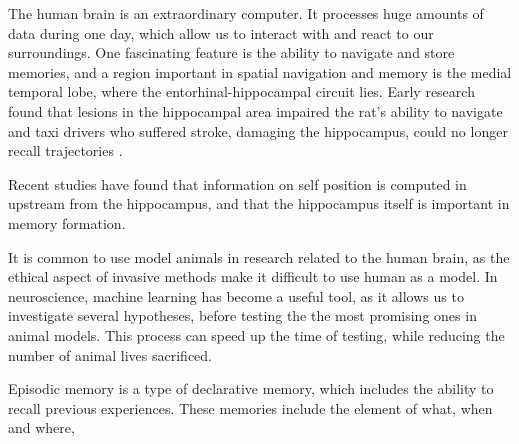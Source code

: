 



The human brain is an extraordinary computer. It processes huge amounts of data during one day, which allow us to interact with and react to our surroundings. %
One fascinating feature is the ability to navigate and store memories, and a region important in spatial navigation and memory is the medial temporal lobe, where the entorhinal-hippocampal circuit lies. Early research found that lesions in the hippocampal area impaired the rat's ability to navigate %
and taxi drivers who suffered stroke, damaging the hippocampus, could no longer recall trajectories \cite{maguire:2000:navigation}.

Recent studies have found that information on self position is computed in upstream from the hippocampus, and that the hippocampus itself is important in memory formation.

It is common to use model animals in research related to the human brain, as the ethical aspect of invasive methods make it difficult to use human as a model. In neuroscience, machine learning has become a useful tool, as it allows us to investigate several hypotheses, before testing the the most promising ones in animal models. This process can speed up the time of testing, while reducing the number of animal lives sacrificed.

Episodic memory is a type of declarative memory, which includes the ability to recall previous experiences. These memories include the element of what, when and where, 
